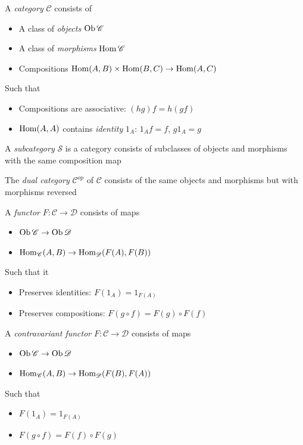 \documentclass[main]{subfiles}
\begin{document}
\begin{definition}
A \textit{category} $\mathscr{C}$ consists of
\begin{itemize}
\item A class of \textit{objects} $\operatorname{Ob}\mathscr C$
\item A class of \textit{morphisms} $\operatorname{Hom}\mathscr C$
\item Compositions $\operatorname{Hom}(A,B)\times\operatorname{Hom}(B,C)\to\operatorname{Hom}(A,C)$
\end{itemize}
Such that
\begin{itemize}
\item Compositions are associative: $(hg)f=h(gf)$
\item $\operatorname{Hom}(A,A)$ contains \textit{identity} $1_A$: $1_Af=f$, $g1_A=g$
\end{itemize}
\end{definition}

\begin{definition}
A \textit{subcategory} $\mathscr S$ is a category consists of subclasses of objects and morphisms with the same composition map
\end{definition}

\begin{definition}
The \textit{dual category} $\mathscr{C}^{op}$ of $\mathscr{C}$ consists of the same objects and morphisms but with morphisms reversed
\end{definition}

\begin{definition}
A \textit{functor} $F:\mathscr{C}\to\mathscr{D}$ consists of maps
\begin{itemize}
\item $\operatorname{Ob}\mathscr C\to\operatorname{Ob}\mathscr D$
\item $\operatorname{Hom}_{\mathscr{C}}(A,B)\to\operatorname{Hom}_{\mathscr{D}}(F(A),F(B))$
\end{itemize}
Such that it
\begin{itemize}
\item Preserves identities: $F(1_A)=1_{F(A)}$
\item Preserves compositions: $F(g\circ f)=F(g)\circ F(f)$
\end{itemize}
\end{definition}

\begin{definition}
A \textit{contravariant functor} $F:\mathscr C\to\mathscr D$ consists of maps
\begin{itemize}
\item $\operatorname{Ob}\mathscr{C}\to\operatorname{Ob}\mathscr{D}$
\item $\operatorname{Hom}_{\mathscr{C}}(A,B)\to\operatorname{Hom}_{\mathscr{D}}(F(B),F(A))$
\end{itemize}
Such that
\begin{itemize}
\item $F(1_A)=1_{F(A)}$
\item $F(g\circ f)=F(f)\circ F(g)$
\end{itemize}
\end{definition}
\end{document}
